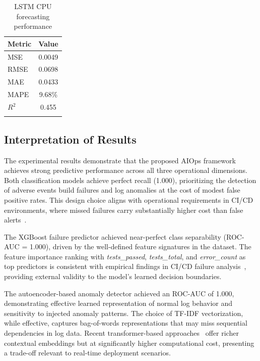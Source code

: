 \documentclass[sn-nature]{sn-jnl}
\theoremstyle{thmstyleone}
\theoremstyle{thmstyletwo}
\theoremstyle{thmstylethree}
\begin{document}
\begin{table}[htbp]
\centering
\caption{LSTM CPU forecasting performance}\label{tab:forecasting}
\begin{tabular}{@{}lc@{}}
\toprule
\textbf{Metric} & \textbf{Value} \\
\midrule
MSE & 0.0049 \\
RMSE & 0.0698 \\
MAE & 0.0433 \\
MAPE & 9.68\% \\
$R^2$ & 0.455 \\
\botrule
\end{tabular}
\end{table}

\subsection{Interpretation of Results}\label{subsec:interpretation}

The experimental results demonstrate that the proposed AIOps framework achieves strong predictive performance across all three operational dimensions. Both classification models achieve perfect recall (1.000), prioritizing the detection of adverse events build failures and log anomalies at the cost of modest false positive rates. This design choice aligns with operational requirements in CI/CD environments, where missed failures carry substantially higher cost than false alerts~\cite{dang2019aiops}.

The XGBoost failure predictor achieved near-perfect class separability (ROC-AUC = 1.000), driven by the well-defined feature signatures in the dataset. The feature importance ranking with \textit{tests\_passed}, \textit{tests\_total}, and \textit{error\_count} as top predictors is consistent with empirical findings in CI/CD failure analysis~\cite{rausch2017empirical, beller2017oops}, providing external validity to the model's learned decision boundaries.

The autoencoder-based anomaly detector achieved an ROC-AUC of 1.000, demonstrating effective learned representation of normal log behavior and sensitivity to injected anomaly patterns. The choice of TF-IDF vectorization, while effective, captures bag-of-words representations that may miss sequential dependencies in log data. Recent transformer-based approaches~\cite{liao2025logtransformer, zhou2024logllm} offer richer contextual embeddings but at significantly higher computational cost, presenting a trade-off relevant to real-time deployment scenarios.
\end{document}
